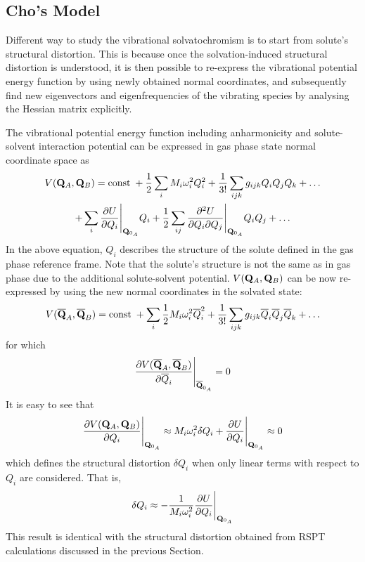 \documentclass[a4paper,titlepage,twoside,fleqn,12pt]{book}
\begin{document}
\begin{refsection}
\section{Cho's Model\label{s:cho-model}}

Different way to study the vibrational solvatochromism is to start from
solute's structural distortion. 
This is because once the solvation-induced structural distortion is 
understood, it is then possible to re-express the vibrational potential energy function
by using newly obtained normal coordinates, and subsequently find new eigenvectors and eigenfrequencies
of the vibrating species by analysing the Hessian matrix explicitly.

The vibrational potential energy function including anharmonicity 
and solute-solvent interaction potential
can be expressed in gas phase state normal coordinate space as
%
\begin{multline} \label{e:vib-pot-energy-function}
 V({\bf Q}_A,{\bf Q}_B) = {\rm const}\;+
\frac{1}{2} \sum_i M_i \omega_i^2 Q_i^2 + \frac{1}{3!} \sum_{ijk}  g_{ijk} Q_iQ_jQ_k + \ldots \\
+ \sum_i \frac{\partial U}{\partial Q_i} \Bigg|_{{\bf Q}_{0_A}} Q_i
+ \frac{1}{2} \sum_{ij} \frac{\partial^2 U}{\partial Q_i \partial Q_j} \Bigg|_{{\bf Q}_{0_A}} Q_iQ_j
+ \ldots
\end{multline}
%
In the above equation, $Q_i$ describes the structure of the solute
defined in the gas phase reference frame. Note that the solute's structure 
is not the same as in gas phase due to the additional solute\hyp{}solvent potential.
$V({\bf Q}_A,{\bf Q}_B)$ can be now re-expressed by using the new normal coordinates in the solvated
state:
%
\begin{equation} \label{e:vib-pot-energy-function-new}
V(\overline{{\bf Q}}_A,\overline{{\bf Q}}_B) = {\rm const}\;+
\sum_i \frac{1}{2} M_i \omega_i^2 \overline{Q}_i^2 + 
\frac{1}{3!} \sum_{ijk}  g_{ijk} \overline{Q}_i\overline{Q}_j\overline{Q}_k + \ldots
\end{equation}
%
for which 
%
\begin{equation} \label{e:vib-pot-energy-function-new.condition}
\frac{\partial V(\overline{{\bf Q}}_A,\overline{{\bf Q}}_B)}
{\partial \overline{Q}_i} \Bigg|_{{\bf \overline{Q}}_{0_A}} = 0
\end{equation}
%
It is easy to see that
%
\begin{equation} \label{e:x863}
\frac{\partial V({{\bf Q}}_A,{{\bf Q}}_B)}
{\partial Q_i} \Bigg|_{{\bf Q}_{0_A}} \approx 
M_i \omega_i^2 \delta Q_i + \frac{\partial U}{\partial Q_i} \Bigg|_{{\bf Q}_{0_A}} 
\approx 0
\end{equation}
%
which defines the structural distortion $\delta Q_i$ when only linear terms with respect to $Q_i$
are considered. That is,
%
\begin{equation} \label{e:struct-dist-cho}
\delta Q_i \approx - \frac{1}{M_i \omega_i^2} \frac{\partial U}{\partial Q_i} \Bigg|_{{\bf Q}_{0_A}} 
\end{equation}
%
This result is identical with the structural distortion
obtained from RSPT calculations discussed in the previous Section.


\end{refsection}
\end{document}
